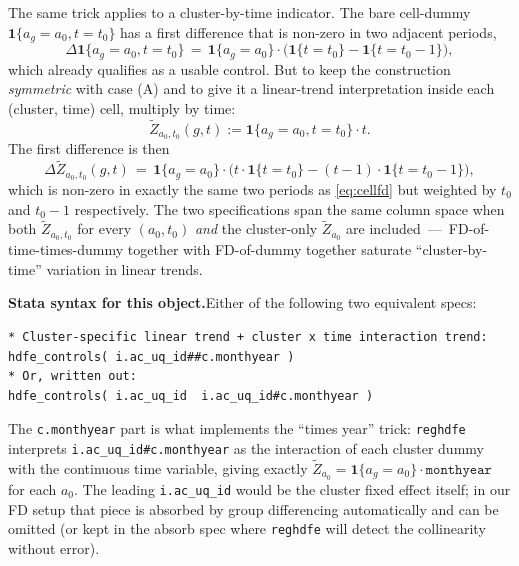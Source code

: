 \documentclass[11pt]{article}
\newcommand{\code}[1]{\texttt{\small #1}}
\newcommand{\1}{\mathbb{1}}
\begin{document}
The same trick applies to a cluster-by-time indicator. The bare cell-dummy
$\mathbf{1}\{a_g = a_0, t = t_0\}$ has a first difference that is non-zero
in two adjacent periods,
\begin{equation}
\Delta \mathbf{1}\{a_g = a_0, t = t_0\} \,=\, \mathbf{1}\{a_g = a_0\}\cdot\bigl(\mathbf{1}\{t = t_0\} - \mathbf{1}\{t = t_0 - 1\}\bigr),
\label{eq:cellfd}
\end{equation}
which already qualifies as a usable control. But to keep the construction
\emph{symmetric} with case (A) and to give it a linear-trend interpretation
inside each (cluster, time) cell, multiply by time:
\begin{equation}
\widetilde{Z}_{a_0, t_0}(g,t) := \mathbf{1}\{a_g = a_0, t = t_0\}\cdot t.
\end{equation}
The first difference is then
\begin{equation}
\Delta \widetilde{Z}_{a_0, t_0}(g,t) \,=\, \mathbf{1}\{a_g = a_0\}\cdot\bigl(t\cdot \mathbf{1}\{t = t_0\} - (t-1)\cdot \mathbf{1}\{t = t_0 - 1\}\bigr),
\label{eq:cellfd_t}
\end{equation}
which is non-zero in exactly the same two periods as \eqref{eq:cellfd} but
weighted by $t_0$ and $t_0 - 1$ respectively. The two specifications span
the same column space when both $\widetilde{Z}_{a_0, t_0}$ for every
$(a_0, t_0)$ \emph{and} the cluster-only $\widetilde{Z}_{a_0}$ are included
\,---\, FD-of-time-times-dummy together with FD-of-dummy together saturate
``cluster-by-time'' variation in linear trends.

\medskip\noindent
\textbf{Stata syntax for this object.}\;Either of the following two
equivalent specs:
\begin{lstlisting}
* Cluster-specific linear trend + cluster x time interaction trend:
hdfe_controls( i.ac_uq_id##c.monthyear )
* Or, written out:
hdfe_controls( i.ac_uq_id  i.ac_uq_id#c.monthyear )
\end{lstlisting}
The \code{c.monthyear} part is what implements the ``times year'' trick:
\texttt{reghdfe} interprets \code{i.ac\_uq\_id\#c.monthyear} as the
interaction of each cluster dummy with the continuous time variable,
giving exactly $\widetilde{Z}_{a_0} = \mathbf{1}\{a_g = a_0\}\cdot
\texttt{monthyear}$ for each $a_0$. The leading \code{i.ac\_uq\_id} would
be the cluster fixed effect itself; in our FD setup that piece is
absorbed by group differencing automatically and can be omitted (or kept
in the absorb spec where \code{reghdfe} will detect the collinearity
without error).
\end{document}
